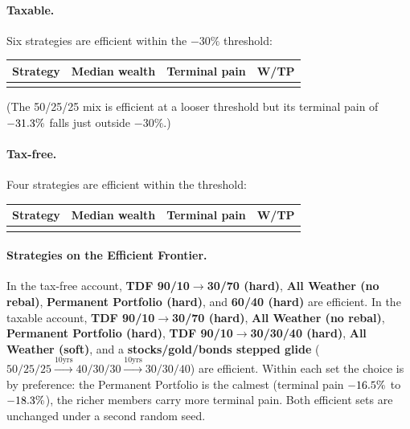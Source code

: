 \documentclass[11pt]{article}
\begin{document}
\paragraph{Taxable.} Six strategies are efficient within the $-30\%$ threshold:

\begin{center}
\begin{tabular}{@{}lrrr@{}}
\toprule
Strategy & Median wealth & Terminal pain & W/TP \\
\midrule
\\
\bottomrule
\end{tabular}
\end{center}
\noindent(The 50/25/25 mix is efficient at a looser threshold but its terminal pain of $-31.3\%$ falls
just outside $-30\%$.)

\paragraph{Tax-free.} Four strategies are efficient within the threshold:

\begin{center}
\begin{tabular}{@{}lrrr@{}}
\toprule
Strategy & Median wealth & Terminal pain & W/TP \\
\midrule
\\
\bottomrule
\end{tabular}
\end{center}

\paragraph{Strategies on the Efficient Frontier.} In the tax-free account, \textbf{TDF 90/10$\to$30/70 (hard)},
\textbf{All Weather (no rebal)}, \textbf{Permanent Portfolio (hard)}, and \textbf{60/40 (hard)} are
efficient. In the taxable account, \textbf{TDF 90/10$\to$30/70 (hard)}, \textbf{All Weather (no
rebal)}, \textbf{Permanent Portfolio (hard)}, \textbf{TDF 90/10$\to$30/30/40 (hard)}, \textbf{All
Weather (soft)}, and a \textbf{stocks/gold/bonds stepped glide} ($50/25/25 \xrightarrow{10\text{yrs}} 40/30/30 \xrightarrow{10\text{yrs}} 30/30/40$) are efficient. Within each set the
choice is by preference: the Permanent Portfolio is the calmest (terminal pain $-16.5\%$ to $-18.3\%$),
the richer members carry more terminal pain. Both efficient sets are unchanged under a second random
seed.
\end{document}
